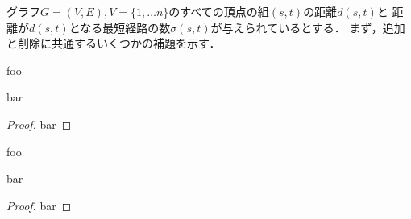 グラフ$G=(V,E),V=\{1,\ldots n\}$のすべての頂点の組$(s,t)$の距離$d(s,t)$と
距離が$d(s,t)$となる最短経路の数$\sigma(s,t)$が与えられているとする．
まず，追加と削除に共通するいくつかの補題を示す．
\begin{lemma-without-proof}[Brandes]
  foo
\end{lemma-without-proof}
\begin{lemma}[難波ら]
  bar
\end{lemma}
\begin{proof}
  bar
\end{proof}
\begin{lemma-without-proof}[Brandes]
  foo
\end{lemma-without-proof}
\begin{lemma}[難波ら]
  bar
\end{lemma}
\begin{proof}
  bar
\end{proof}

